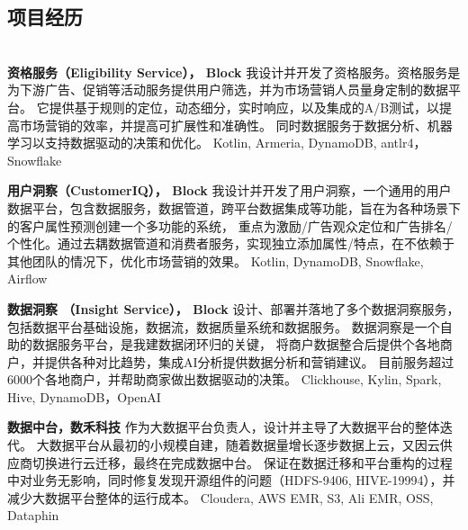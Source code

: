 \documentclass{res}[8.5pt]
\begin{document}
\begin{resume}
                \vspace{-10pt}
                \section{{项目经历}}
                \vspace{-12pt}
                \hrulefill\\

                \vspace{-35pt}
                {\bf 资格服务（Eligibility Service）， Block}
                我设计并开发了资格服务。资格服务是为下游广告、促销等活动服务提供用户筛选，并为市场营销人员量身定制的数据平台。
                它提供基于规则的定位，动态细分，实时响应，以及集成的A/B测试，以提高市场营销的效率，并提高可扩展性和准确性。
                同时数据服务于数据分析、机器学习以支持数据驱动的决策和优化。
                Kotlin, Armeria, DynamoDB, antlr4，Snowflake

                \vspace{-10pt}
                {\bf 用户洞察（CustomerIQ）， Block}
                我设计并开发了用户洞察，一个通用的用户数据平台，包含数据服务，数据管道，跨平台数据集成等功能，旨在为各种场景下的客户属性预测创建一个多功能的系统，
                重点为激励/广告观众定位和广告排名/个性化。通过去耦数据管道和消费者服务，实现独立添加属性/特点，在不依赖于其他团队的情况下，优化市场营销的效果。
                Kotlin, DynamoDB, Snowflake, Airflow

                \vspace{-10pt}
                {\bf 数据洞察 （Insight Service）， Block}
                设计、部署并落地了多个数据洞察服务，包括数据平台基础设施，数据流，数据质量系统和数据服务。
                数据洞察是一个自助的数据服务平台，是我建数据闭环归的关键，
                将商户数据整合后提供个各地商户，并提供各种对比趋势，集成AI分析提供数据分析和营销建议。
                目前服务超过6000个各地商户，并帮助商家做出数据驱动的决策。
                Clickhouse, Kylin, Spark, Hive, DynamoDB，OpenAI

                \vspace{-10pt}
                {\bf 数据中台，数禾科技}
                作为大数据平台负责人，设计并主导了大数据平台的整体迭代。
                大数据平台从最初的小规模自建，随着数据量增长逐步数据上云，又因云供应商切换进行云迁移，最终在完成数据中台。
                保证在数据迁移和平台重构的过程中对业务无影响，同时修复发现开源组件的问题（HDFS-9406, HIVE-19994），并减少大数据平台整体的运行成本。
                Cloudera, AWS EMR, S3, Ali EMR, OSS, Dataphin


\end{resume}
\end{document}

